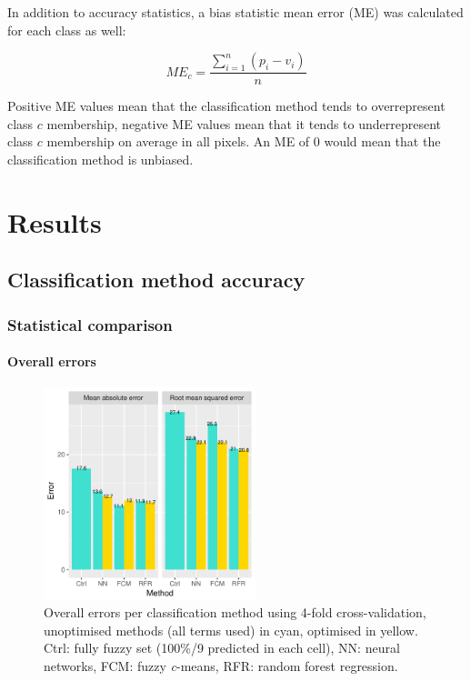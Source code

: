 \documentclass[a4paper,12pt]{scrbook}
\begin{document}
In addition to accuracy statistics, a bias statistic mean error (ME) was calculated for each class as well:

$$ ME_c = \frac{\displaystyle\sum_{i=1}^{n}{ (p_{i} - v_{i}) }}{n} $$

Positive ME values mean that the classification method tends to overrepresent class $c$ membership, negative ME values mean that it tends to underrepresent class $c$ membership on average in all pixels. An ME of 0 would mean that the classification method is unbiased.

\chapter{Results}

\section{Classification method accuracy}

\subsection{Statistical comparison}

\subsubsection{Overall errors}

\begin{figure}
  \centering
  \includegraphics[width=0.55\textwidth]{thesis-figures/total-errors}
  \caption{Overall errors per classification method using 4-fold cross-validation, unoptimised methods (all terms used) in cyan, optimised in yellow. Ctrl: fully fuzzy set (100\%/9 predicted in each cell), NN: neural networks, FCM: fuzzy \textit{c}-means, RFR: random forest regression.}
  \label{fig-total-errors}
\end{figure}
\end{document}
